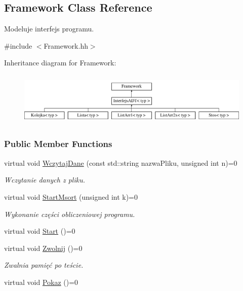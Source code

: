 \hypertarget{class_framework}{\subsection{Framework Class Reference}
\label{class_framework}
}


Modeluje interfejs programu.  




{\ttfamily \#include $<$Framework.\-hh$>$}

Inheritance diagram for Framework\-:\begin{figure}[H]
\begin{center}
\leavevmode
\includegraphics[height=2.564885cm]{class_framework}
\end{center}
\end{figure}
\subsubsection*{Public Member Functions}
\begin{DoxyCompactItemize}
\item 
virtual void \hyperlink{class_framework_a6ca4333f327109885071b5291486b492}{Wczytaj\-Dane} (const std\-::string nazwa\-Pliku, unsigned int n)=0
\begin{DoxyCompactList}\small\item\em Wczytanie danych z pliku. \end{DoxyCompactList}\item 
virtual void \hyperlink{class_framework_a883b9c2c7258021f9e8c55e02a9d8c60}{Start\-Msort} (unsigned int k)=0
\begin{DoxyCompactList}\small\item\em Wykonanie części obliczeniowej programu. \end{DoxyCompactList}\item 
virtual void \hyperlink{class_framework_a4d29e27b546088b26c1645a53adff349}{Start} ()=0
\item 
virtual void \hyperlink{class_framework_a6ae437019d35e0524adbeecc484f327a}{Zwolnij} ()=0
\begin{DoxyCompactList}\small\item\em Zwalnia pamięć po teście. \end{DoxyCompactList}\item 
virtual void \hyperlink{class_framework_ac1aff3a993eda9a110495d4a9d636900}{Pokaz} ()=0
\end{DoxyCompactItemize}


